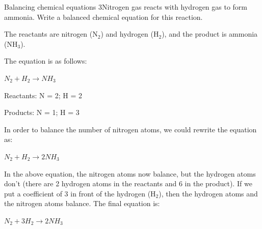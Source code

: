 \begin{wex}{Balancing chemical equations 3}{Nitrogen gas reacts with hydrogen gas to form ammonia. Write a balanced chemical equation for this reaction.\\}

{}

The reactants are nitrogen (N$_{2}$) and hydrogen (H$_{2}$), and the product is ammonia (NH$_{3}$).\\

{

The equation is as follows:

\begin{center}
\rm${N_{2} + H_{2} \rightarrow NH_{3}}$\\
\end{center}
}
{

Reactants: N = 2; H = 2

Products: N = 1; H = 3\\
}
{
In order to balance the number of nitrogen atoms, we could rewrite the equation as:

\begin{center}
\rm${N_{2} + H_{2} \rightarrow 2NH_{3}}$\\
\end{center}
}

{

In the above equation, the nitrogen atoms now balance, but the hydrogen atoms don't (there are 2 hydrogen atoms in the reactants and 6 in the product). If we put a coefficient of 3 in front of the hydrogen (H$_{2}$), then the hydrogen atoms and the nitrogen atoms balance. The final equation is:

\begin{center}
\rm${N_{2} + 3H_{2} \rightarrow 2NH_{3}}$\\
\end{center}
}
\end{wex}
    \noindent
\par
            \label{m38726*secfhsst!!!underscore!!!id590}\vspace{.5cm} 
      \noindent
